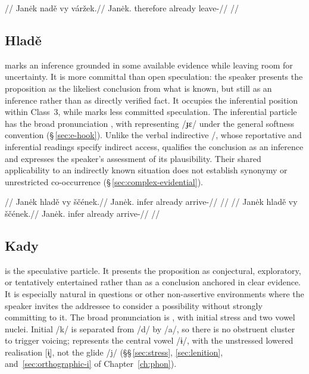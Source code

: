 \pex
\begingl
\glpreamble {}//
\gla Janėk nadě vy váržek.//
\glb Janėk.\Dir{} therefore already leave-\Pf{}//
\glft {}//
\endgl
\xe

\subsection{Hladě}  marks an inference grounded in some available
evidence while leaving room for uncertainty. It is more committal than open
speculation: the speaker presents the proposition as the likeliest conclusion
from what is known, but still as an inference rather than as directly verified
fact. It occupies the inferential position within Class~3, while
 marks less committed speculation. The inferential particle
 has the broad pronunciation \ipagloss{[ˈxla.ɟɛ]}, with
 representing /ɟɛ/ under the general softness convention
(§\,\ref{sec:e-hook}). Unlike the verbal indirective
/, whose reportative and inferential readings specify
indirect access,  qualifies the conclusion as an inference
and expresses the speaker's assessment of its plausibility. Their shared
applicability to an indirectly known situation does not establish
synonymy or unrestricted co-occurrence
(§\,\ref{sec:complex-evidential}).

\pex
\a
\begingl
\glpreamble {}//
\gla Janėk hladě vy ščének.//
\glb Janėk.\Dir{} infer already arrive-\Pf{}//
\glft {}//
\endgl
\a
\begingl
\glpreamble {}//
\gla \ljudge{\#}Janėk hladě vy ščének.//
\glb Janėk.\Dir{} infer already arrive-\Pf{}//
\glft {}//
\endgl
\xe

\subsection{Kady}  is the speculative particle. It presents the
proposition as conjectural, exploratory, or tentatively entertained rather
than as a conclusion anchored in clear evidence. It is especially natural in
questions or other non-assertive environments where the speaker invites the
addressee to consider a possibility without strongly committing to it.
The broad pronunciation is \ipagloss{[ˈka.dɨ̞]}, with initial stress and two
vowel nuclei. Initial /k/ is separated from /d/ by /a/, so there is no
obstruent cluster to trigger voicing;  represents the central vowel
/ɨ/, with the unstressed lowered realisation [ɨ̞], not the glide /j/
(§§\,\ref{sec:stress}, \ref{sec:lenition}, and~\ref{sec:orthographic-i} of
Chapter~\ref{ch:phon}).

